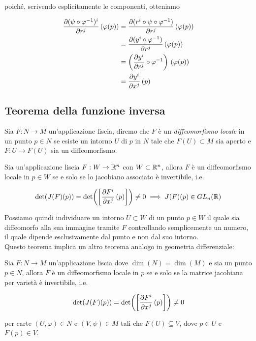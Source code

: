 poiché, scrivendo esplicitamente le componenti, otteniamo

\begin{align}
	\begin{split}
		\pdv{(\psi \circ \varphi^{-1})^{i}}{r^{j}} \, (\varphi(p)) &= \pdv{(r^{i} \circ \psi \circ \varphi^{-1})}{r^{j}} \, (\varphi(p)) \\
		&= \pdv{(y^{i} \circ \varphi^{-1})}{r^{j}} \, (\varphi(p)) \\
		&= \left( \pdv{y^{i}}{r^{j}} \circ \varphi^{-1} \right) \, (\varphi(p)) \\
		&= \pdv{y^{i}}{x^{j}} \, (p)
	\end{split}
\end{align}

\subsection{Teorema della funzione inversa}

Sia $ F : N \to M $ un'applicazione liscia, diremo che $ F $ è un \textit{diffeomorfismo locale} in un punto $ p \in N $ se esiste un intorno $ U $ di $ p $ in $ N $ tale che $ F(U) \subset M $ sia aperto e $ F : U \to F(U) $ sia un diffeomorfismo.

\begin{theorem}
	Sia un'applicazione liscia $ F : W \to \mathbb{R}^{n} $ con $ W \subset \mathbb{R}^{n} $, allora $ F $ è un diffeomorfismo locale in $ p \in W $ se e solo se lo jacobiano associato è invertibile, i.e.
	
	\begin{equation}
		\det(J(F)(p)) = \det( \left[ \pdv{F^{i}}{x^{j}} \, (p) \right] ) \neq 0 %
		\implies %
		J(F)(p) \in GL_{n} (\R)
	\end{equation}
\end{theorem}

Possiamo quindi individuare un intorno $ U \subset W $ di un punto $ p \in W $ il quale sia diffeomorfo alla sua immagine tramite $ F $ controllando semplicemente un numero, il quale dipende esclusivamente dal punto e non dal suo intorno. \\
Questo teorema implica un altro teorema analogo in geometria differenziale:

\begin{theorem}\label{thm:ift}
	Sia $ F : N \to M $ un'applicazione liscia dove $ \dim(N) = \dim(M) $ e sia un punto $ p \in N $, allora $ F $ è un diffeomorfismo locale in $ p $ se e solo se la matrice jacobiana per varietà è invertibile, i.e.
	
	\begin{equation}
		\det(J(F)(p)) = \det( \left[ \pdv{F^{i}}{x^{j}} \, (p) \right] ) \neq 0
	\end{equation}
	
	per carte $ (U,\varphi) \in N $ e $ (V,\psi) \in M $ tali che $ F(U) \subseteq V $, dove $ p \in U $ e $ F(p) \in V $.
\end{theorem}

